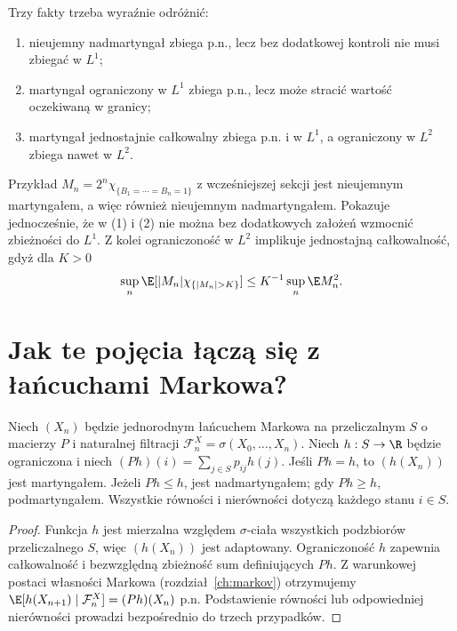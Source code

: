\begin{przyklad}
Trzy fakty trzeba wyraźnie odróżnić:
\begin{enumerate}
\item nieujemny nadmartyngał zbiega p.n.,
  lecz bez dodatkowej kontroli nie musi zbiegać w $L^1$;
\item martyngał ograniczony w $L^1$ zbiega p.n.,
  lecz może stracić wartość oczekiwaną w granicy;
\item martyngał jednostajnie całkowalny zbiega
  p.n. i w $L^1$, a ograniczony w $L^2$
  zbiega nawet w $L^2$.
\end{enumerate}
Przykład $M_n=2^n\chi_{\{B_1=\cdots=B_n=1\}}$
z wcześniejszej sekcji jest nieujemnym martyngałem,
a więc również nieujemnym nadmartyngałem.
Pokazuje jednocześnie, że w (1) i (2) nie można
bez dodatkowych założeń wzmocnić zbieżności do $L^1$.
Z kolei ograniczoność w $L^2$ implikuje
jednostajną całkowalność, gdyż dla $K>0$
\[
\sup_n\E[|M_n|\chi_{\{|M_n|>K\}}]
\leq K^{-1}\sup_n\E M_n^2.
\]
\end{przyklad}

\section{Jak te pojęcia łączą się z łańcuchami Markowa?}

\begin{twierdzenie}
Niech $(X_n)$ będzie jednorodnym łańcuchem Markowa
na przeliczalnym $S$ o macierzy $P$ i naturalnej
filtracji $\mathcal F_n^X=\sigma(X_0,\ldots,X_n)$.
Niech $h:S\to\R$ będzie ograniczona i niech
$(Ph)(i)=\sum_{j\in S}p_{ij}h(j)$.
Jeśli $Ph=h$, to $(h(X_n))$ jest martyngałem.
Jeżeli $Ph\leq h$, jest nadmartyngałem;
gdy $Ph\geq h$, podmartyngałem.
Wszystkie równości i nierówności dotyczą
każdego stanu $i\in S$.
\end{twierdzenie}
\begin{proof}
Funkcja $h$ jest mierzalna względem $\sigma$-ciała
wszystkich podzbiorów przeliczalnego $S$, więc
$(h(X_n))$ jest adaptowany. Ograniczoność $h$
zapewnia całkowalność i bezwzględną zbieżność
sum definiujących $Ph$. Z warunkowej postaci
własności Markowa (rozdział~\ref{ch:markov})
otrzymujemy
$\E[h(X_{n+1})\mid\mathcal F_n^X]
=(Ph)(X_n)$ p.n.
Podstawienie równości lub odpowiedniej nierówności
prowadzi bezpośrednio do trzech przypadków.
\end{proof}

